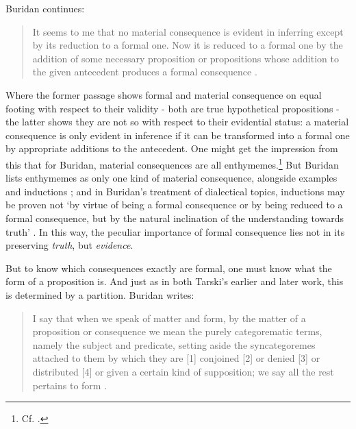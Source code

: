 \documentclass[]{article}
\begin{document}
Buridan continues: 
\begin{quote}
	It seems to me that no material consequence is evident in inferring except by its reduction to a formal one. Now it is reduced to a formal one by the addition of some necessary proposition or propositions whose addition to the given antecedent produces a formal consequence \autocite[I. 4, 68]{Buridan2015}.
\end{quote}

Where the former passage shows formal and material consequence on equal footing with respect to their validity - both are true hypothetical propositions - the latter shows they are not so with respect to their evidential status: a material consequence is only evident in inference if it can be transformed into a formal one by appropriate additions to the antecedent. One might get the impression from this that for Buridan, material consequences are all enthymemes.\footnote{Cf. \autocite[66]{BurleyDPAL}.} But Buridan lists enthymemes as only one kind of material consequence, alongside examples and inductions \autocite[III. 1, 113]{Buridan2015}; and in Buridan's treatment of dialectical topics, inductions may be proven not `by virtue of being a formal consequence or by being reduced to a formal consequence, but by the natural inclination of the understanding towards truth' \autocite[6.1.5]{BuridanLoci}. In this way, the peculiar importance of formal consequence lies not in its preserving \textit{truth}, but \textit{evidence}.

But to know which consequences exactly are formal, one must know what the form of a proposition is. And just as in both Tarski's earlier and later work, this is determined by a partition. Buridan writes:

\begin{quote}
	I say that when we speak of matter and form, by the matter of a proposition or consequence we mean the purely categorematic terms, namely the subject and predicate, setting aside the syncategoremes attached to them by which they are [1] conjoined [2] or denied [3] or distributed [4] or given a certain kind of supposition; we say all the rest pertains to form \autocite[I. 7, 74]{Buridan2015}.
\end{quote}
\end{document}
